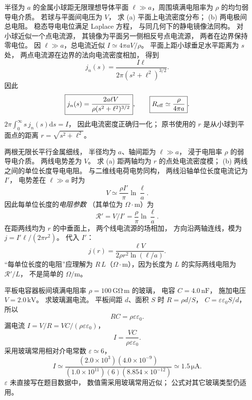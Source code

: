 半径为 $a$ 的金属小球距无限理想导体平面
$\ell\gg a$，周围填满电阻率为 $\rho$
的均匀弱导电介质。
若球与平面间电压为 $V$，
求 (a) 平面上电流密度分布；
(b) 两电极间总电阻。
\exsolution
稳态导电电位满足 Laplace 方程，
与同几何下的静电镜像法同构。
对小球近似一个点电流源，
其镜像为平面另一侧相反号点电流源，
两者在边界保持零电位。
因 $\ell\gg a$，总电流近似
$I\simeq4\pi aV/\rho$。
平面上距小球垂足水平距离为 $s$ 处，
两点电流源在边界的法向电流密度相加，
得到
\[
j_n(s)=\frac{I\ell}
{2\pi(s^2+\ell^2)^{3/2}}.
\]
因此
\[
\boxed{j_n(s)=
\frac{2a\ell V}
{\rho(s^2+\ell^2)^{3/2}}},
\qquad
\boxed{R_{\rm eff}\simeq\frac{\rho}{4\pi a}}.
\]
\excheck $2\pi\int_0^\infty s\,j_n(s)\mathrm ds=I$，
因此电流密度正确归一化；
原书使用的 $r$ 是从小球到平面点的距离
$r=\sqrt{s^2+\ell^2}$。

两根无限长平行金属细线，
半径均为 $a$、轴间距为 $\ell\gg a$，
浸于电阻率 $\rho$ 的弱导电介质。
两线电势差为 $V$。
求 (a) 距两轴均为 $r$ 的点处电流密度模；
(b) 两线之间的单位长度导电电阻。
\exsolution
与二维线电荷电势同构，
两线沿轴单位长度电流记为 $I'$，
电势差在 $\ell\gg a$ 时为
\[
V\simeq\frac{\rho I'}{\pi}\ln\frac{\ell}{a}.
\]
因此每单位长度的\emph{电阻参数}
（其单位为 $\Omega\cdot\mathrm m$）为
\[
\boxed{\mathcal R'=V/I'
=\frac{\rho}{\pi}\ln\frac{\ell}{a}}.
\]
在距两线均为 $r$ 的中垂面上，
两个线电流源的场相加，
方向沿两轴连线，模为
$j=I'\ell/(2\pi r^2)$。
代入 $I'$：
\[
\boxed{j(r)=
\frac{\ell V}{2\rho r^2\ln(\ell/a)}}.
\]
\excheck “每单位长度的电阻”应理解为
$R\,L$（$\Omega\cdot$m），因为长度为
$L$ 的实际两线电阻为 $\mathcal R'/L$，
不是简单的 $\Omega/\mathrm m$。

平板电容器板间填满电阻率
$\rho=100\,\mathrm{G\Omega\,m}$ 的玻璃，
电容 $C=4.0\,\mathrm{nF}$，
施加电压 $V=2.0\,\mathrm{kV}$。
求玻璃漏电流。
\exsolution
平板间距 $d$、面积 $S$ 时
$R=\rho d/S$，
$C=\varepsilon\varepsilon_0S/d$，
所以
\[
\boxed{RC=\rho\varepsilon\varepsilon_0}.
\]
漏电流
$I=V/R=VC/(\rho\varepsilon\varepsilon_0)$，
\[
\boxed{I=\frac{VC}{\rho\varepsilon\varepsilon_0}}.
\]
采用玻璃常用相对介电常数
$\varepsilon\simeq6$，
\[
\boxed{I\simeq
\frac{(2.0\times10^3)(4.0\times10^{-9})}
{(1.0\times10^{11})(6)(8.854\times10^{-12})}
\simeq1.5\,\mathrm{\mu A}}.
\]
\excheck $\varepsilon$ 未直接写在题目数据中，
数值需采用玻璃常用近似；
公式对其它玻璃类型仍适用。

